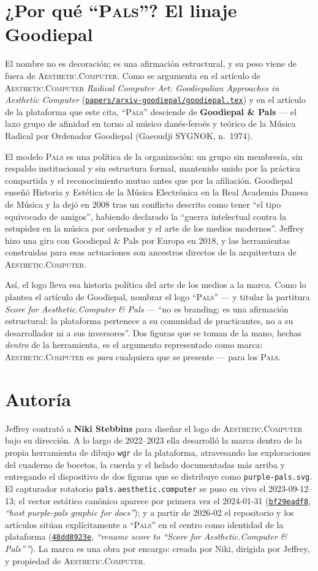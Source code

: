 \documentclass[10pt,letterpaper,twocolumn]{article}
\newcommand{\ac}{\textsc{Aesthetic}{\color{acpink}.}\textsc{Computer}}
\newcommand{\pals}{\textsc{Pals}}
\newcommand{\commit}[2]{\href{https://github.com/whistlegraph/aesthetic-computer/commit/#1}{\texttt{#1}}, \emph{``#2''}}
\newcommand{\repofile}[1]{\href{https://github.com/whistlegraph/aesthetic-computer/blob/main/#1}{\texttt{#1}}}
\begin{document}
\section{¿Por qué ``\pals{}''? El linaje Goodiepal}

El nombre no es decoración; es una afirmación estructural, y su peso viene de
fuera de \ac{}. Como se argumenta en el artículo de \ac{}
\emph{Radical Computer Art: Goodiepalian Approaches in Aesthetic
Computer} (\repofile{papers/arxiv-goodiepal/goodiepal.tex}) y en el artículo
de la plataforma que este cita, ``\pals{}'' desciende de \textbf{Goodiepal \&
Pals} --- el laxo grupo de afinidad en torno al músico danés-feroés y teórico
de la Música Radical por Ordenador Goodiepal (Gaeoudji SYGNOK, n.~1974).

El modelo \pals{} es una política de la organización: un grupo sin membresía,
sin respaldo institucional y sin estructura formal, mantenido unido por la
práctica compartida y el reconocimiento mutuo antes que por la afiliación.
Goodiepal enseñó Historia y Estética de la Música Electrónica en la Real
Academia Danesa de Música y la dejó en 2008 tras un conflicto descrito como
tener ``el tipo equivocado de amigos'', habiendo declarado la ``guerra
intelectual contra la estupidez en la música por ordenador y el arte de los
medios modernos''. Jeffrey hizo una gira con Goodiepal \& Pals por Europa en
2018, y las herramientas construidas para esas actuaciones son ancestros
directos de la arquitectura de \ac{}.

Así, el logo lleva esa historia política del arte de los medios a la marca.
Como lo plantea el artículo de Goodiepal, nombrar el logo ``\pals{}'' --- y
titular la partitura \emph{Score for Aesthetic{\color{acpink}.}Computer \&
Pals} --- ``no es branding; es una afirmación estructural: la plataforma
pertenece a su comunidad de practicantes, no a su desarrollador ni a sus
inversores''. Dos figuras que se toman de la mano, hechas \emph{dentro} de la
herramienta, es el argumento representado como marca: \ac{} es \emph{para}
cualquiera que se presente --- para los \pals{}.

\section{Autoría}

Jeffrey contrató a \textbf{Niki Stebbins} para diseñar el logo de \ac{} bajo
su dirección. A lo largo de 2022--2023 ella desarrolló la marca dentro de la
propia herramienta de dibujo \texttt{wgr} de la plataforma, atravesando las
exploraciones del cuaderno de bocetos, la cuerda y el helado documentadas más
arriba y entregando el dispositivo de dos figuras que se distribuye como
\texttt{purple-pals.svg}. El capturador rotatorio
\texttt{pals.aesthetic.computer} se puso en vivo el 2023-09-12--13; el vector
estático canónico aparece por primera vez el 2024-01-31
(\commit{bf29eadf8}{host purple-pals graphic for docs}); y a partir de 2026-02
el repositorio y los artículos sitúan explícitamente a ``\pals{}'' en el
centro como identidad de la plataforma (\commit{48dd8923e}{rename score to
``Score for Aesthetic.Computer \& Pals''}). La marca es una obra por encargo:
creada por Niki, dirigida por Jeffrey, y propiedad de \ac{}.
\end{document}
